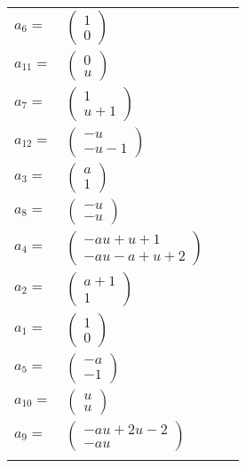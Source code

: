 \documentclass[1p]{elsarticle_modified}
\theoremstyle{definition}
\begin{document}
\begin{tabular}{m{7pt} m{180pt} m{7pt} m{180pt} }
\flushright $a_{6}=$&$\begin{pmatrix}1\\0\end{pmatrix}$ \\
\flushright $a_{11}=$&$\begin{pmatrix}0\\u\end{pmatrix}$ \\
\flushright $a_{7}=$&$\begin{pmatrix}1\\u+1\end{pmatrix}$ \\
\flushright $a_{12}=$&$\begin{pmatrix}- u\\- u-1\end{pmatrix}$ \\
\flushright $a_{3}=$&$\begin{pmatrix}a\\1\end{pmatrix}$ \\
\flushright $a_{8}=$&$\begin{pmatrix}- u\\- u\end{pmatrix}$ \\
\flushright $a_{4}=$&$\begin{pmatrix}- a u+u+1\\- a u- a+u+2\end{pmatrix}$ \\
\flushright $a_{2}=$&$\begin{pmatrix}a+1\\1\end{pmatrix}$ \\
\flushright $a_{1}=$&$\begin{pmatrix}1\\0\end{pmatrix}$ \\
\flushright $a_{5}=$&$\begin{pmatrix}- a\\-1\end{pmatrix}$ \\
\flushright $a_{10}=$&$\begin{pmatrix}u\\u\end{pmatrix}$ \\
\flushright $a_{9}=$&$\begin{pmatrix}- a u+2 u-2\\- a u\end{pmatrix}$\\&\end{tabular}
\end{document}
